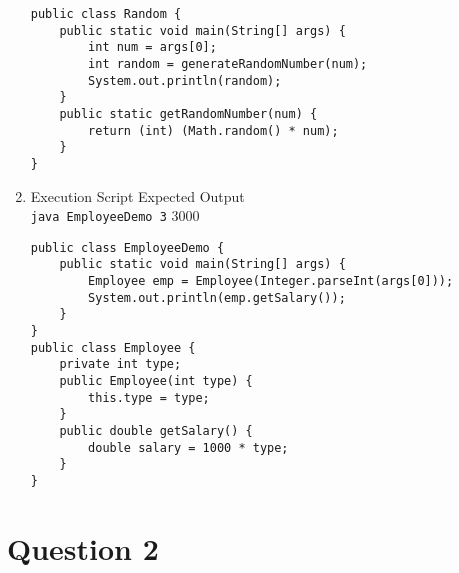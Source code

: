 \documentclass[12pt,letterpaper,twoside]{article}
\begin{document}
\begin{enumerate}[label=\textbf{(\alph*)}]
\begin{lstlisting}
public class Random {
	public static void main(String[] args) {
		int num = args[0];
		int random = generateRandomNumber(num);
		System.out.println(random);
	}
	public static getRandomNumber(num) {
		return (int) (Math.random() * num);
	}
}
\end{lstlisting}

\newpage

\item Execution Script \hfill Expected Output\\
\texttt{java EmployeeDemo 3} \hfill 3000

\begin{lstlisting}
public class EmployeeDemo {
	public static void main(String[] args) {
		Employee emp = Employee(Integer.parseInt(args[0]));
		System.out.println(emp.getSalary());
	}
}
public class Employee {
	private int type;
	public Employee(int type) {
		this.type = type;
	}
	public double getSalary() {
		double salary = 1000 * type;
	}
}
\end{lstlisting}

\end{enumerate}

\section*{Question 2}
\end{document}
